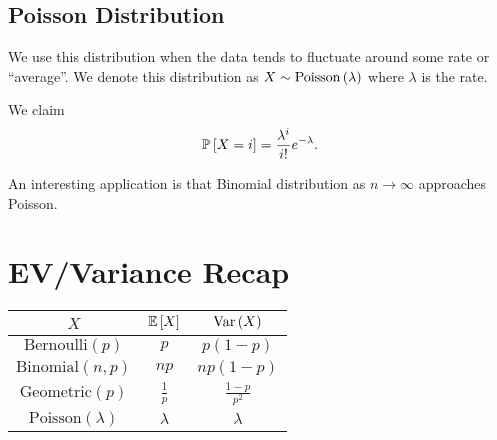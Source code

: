 \subsection{Poisson Distribution}
We use this distribution when the data tends to fluctuate around some rate or ``average''. We denote this distribution as $X \sim \text{Poisson}\left( \lambda \right)$ where $\lambda$ is the rate. 

We claim \[ \mathbb{P}\left[ X = i \right] = \dfrac{{\lambda}^{i}}{i !} e^{- {\lambda}}. \]

An interesting application is that Binomial distribution as $n \to \infty$ approaches Poisson.

\section{EV/Variance Recap}

\begin{center}
    \begin{tabular}{|c|c|c|}
        \hline 
        $X$ & $\mathbb{E}\left[ X \right]$ & $\text{Var}\left( X \right)$ \\
        \hline
        $\text{Bernoulli}(p)$ & $p$ & $p(1-p)$ \\
        \hline
        $\text{Binomial}(n,p)$ & $np$ & $np(1-p)$ \\
        \hline
        $\text{Geometric}(p)$ & $\frac{1}{p}$ & $\frac{1-p}{p^2}$ \\
        \hline
        $\text{Poisson}(\lambda)$ & $\lambda$ & $\lambda$ \\
        \hline
    \end{tabular}
\end{center}